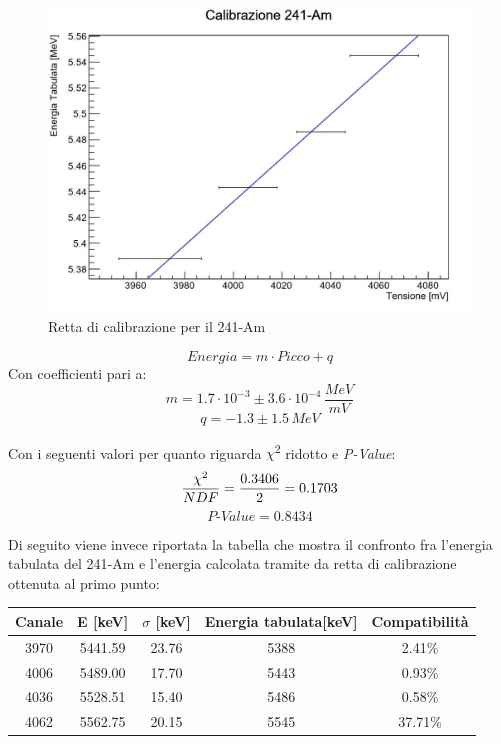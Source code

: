 \documentclass[a4paper,10pt]{article}
\begin{document}
\begin{figure}[H]
    \centering
    \includegraphics[scale=0.7]{rettaame.jpg}
    \caption{Retta di calibrazione per il 241-Am}
\end{figure}
$$
    Energia = m \cdot Picco + q
$$
Con coefficienti pari a:
$$
    m = 1.7\cdot10^{-3} \pm 3.6\cdot10^{-4}\, \frac{MeV}{mV}
$$
$$
    q = - 1.3 \pm 1.5\, MeV
$$

\noindent Con i seguenti valori per quanto riguarda $\chi$\textsuperscript{2} ridotto e \textit{P-Value}:
$$
    \frac{\chi\textsuperscript{2}}{NDF} = \frac{0.3406}{2} = 0.1703
$$
$$
    \textit{P-Value} = 0.8434
$$

\noindent Di seguito viene invece riportata la tabella che mostra il confronto fra l'energia tabulata del 241-Am e l'energia calcolata tramite da retta di calibrazione ottenuta al primo punto:

\begin{center}
    \begin{tabular}{ccccc}
        \toprule
        Canale & E [keV] & $\sigma$ [keV] & Energia tabulata[keV] & Compatibilit\`a \\
        \midrule
        3970 & 5441.59 & 23.76 & 5388 & 2.41\%\\
        4006 & 5489.00 & 17.70 & 5443 & 0.93\%\\
        4036 & 5528.51 & 15.40 & 5486 & 0.58\%\\
        4062 & 5562.75 & 20.15 & 5545 & 37.71\%\\
        \bottomrule
    \end{tabular}\\
\end{center}
\end{document}
